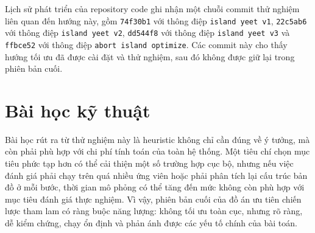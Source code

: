 \documentclass[../DoAn.tex]{subfiles}
\begin{document}
Lịch sử phát triển của repository code ghi nhận một chuỗi commit thử nghiệm liên quan đến hướng này, gồm \texttt{74f30b1} với thông điệp \texttt{island yeet v1}, \texttt{22c5ab6} với thông điệp \texttt{island yeet v2}, \texttt{dd544f8} với thông điệp \texttt{island yeet v3} và \texttt{ffbce52} với thông điệp \texttt{abort island optimize}. Các commit này cho thấy hướng tối ưu đã được cài đặt và thử nghiệm, sau đó không được giữ lại trong phiên bản cuối.

\section{Bài học kỹ thuật}

Bài học rút ra từ thử nghiệm này là heuristic không chỉ cần đúng về ý tưởng, mà còn phải phù hợp với chi phí tính toán của toàn hệ thống. Một tiêu chí chọn mục tiêu phức tạp hơn có thể cải thiện một số trường hợp cục bộ, nhưng nếu việc đánh giá phải chạy trên quá nhiều ứng viên hoặc phải phân tích lại cấu trúc bản đồ ở mỗi bước, thời gian mô phỏng có thể tăng đến mức không còn phù hợp với mục tiêu đánh giá thực nghiệm. Vì vậy, phiên bản cuối của đồ án ưu tiên chiến lược tham lam có ràng buộc năng lượng: không tối ưu toàn cục, nhưng rõ ràng, dễ kiểm chứng, chạy ổn định và phản ánh được các yếu tố chính của bài toán.
\end{document}
